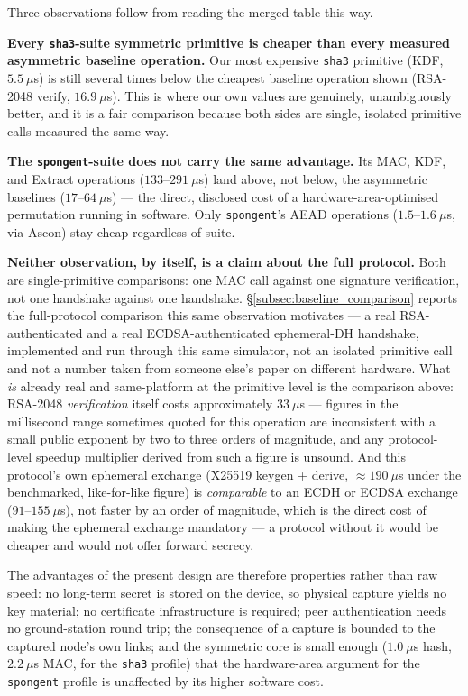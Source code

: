\documentclass[11pt,a4paper]{article}
\begin{document}
Three observations follow from reading the merged table this way.

\textbf{Every \texttt{sha3}-suite symmetric primitive is cheaper than every
measured asymmetric baseline operation.} Our most expensive \texttt{sha3}
primitive (KDF, $5.5~\mu$s) is still several times below the cheapest baseline
operation shown (RSA-2048 verify, $16.9~\mu$s). This is where our own values are
genuinely, unambiguously better, and it is a fair comparison because both sides
are single, isolated primitive calls measured the same way.

\textbf{The \texttt{spongent}-suite does not carry the same advantage.} Its
MAC, KDF, and Extract operations ($133$--$291~\mu$s) land above, not below, the
asymmetric baselines ($17$--$64~\mu$s) --- the direct, disclosed cost of a
hardware-area-optimised permutation running in software. Only \texttt{spongent}'s
AEAD operations ($1.5$--$1.6~\mu$s, via Ascon) stay cheap regardless of suite.

\textbf{Neither observation, by itself, is a claim about the full protocol.}
Both are single-primitive comparisons: one MAC call against one signature
verification, not one handshake against one handshake.
\S\ref{subsec:baseline_comparison} reports the full-protocol comparison this
same observation motivates --- a real RSA-authenticated and a real
ECDSA-authenticated ephemeral-DH handshake, implemented and run through this
same simulator, not an isolated primitive call and not a number taken from
someone else's paper on different hardware. What \emph{is} already real and
same-platform at the primitive level is the comparison above: RSA-2048
\emph{verification} itself costs
approximately $33~\mu$s --- figures in the millisecond range sometimes quoted
for this operation are inconsistent with a small public exponent by two to
three orders of magnitude, and any protocol-level speedup multiplier derived
from such a figure is unsound. And this protocol's own ephemeral exchange
(X25519 keygen + derive, $\approx190~\mu$s under the benchmarked, like-for-like
figure) is \emph{comparable} to an ECDH or ECDSA exchange ($91$--$155~\mu$s),
not faster by an order of magnitude, which is the direct cost of making the
ephemeral exchange mandatory --- a protocol without it would be cheaper and
would not offer forward secrecy.

The advantages of the present design are therefore properties rather than raw
speed: no long-term secret is stored on the device, so physical capture yields no
key material; no certificate infrastructure is required; peer authentication needs
no ground-station round trip; the consequence of a capture is bounded to the
captured node's own links; and the symmetric core is small enough
($1.0~\mu$s hash, $2.2~\mu$s MAC, for the \texttt{sha3} profile) that the
hardware-area argument for the \texttt{spongent} profile is unaffected by its
higher software cost.
\end{document}
